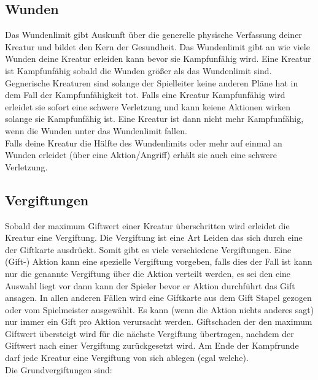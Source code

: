 \subsection*{Wunden}
Das Wundenlimit gibt Auskunft über die generelle physische Verfassung deiner Kreatur und bildet den Kern der Gesundheit. Das Wundenlimit gibt an wie viele Wunden deine Kreatur erleiden kann bevor sie Kampfunfähig wird.
Eine Kreatur ist Kampfunfähig sobald die Wunden größer als das Wundenlimit sind. Gegnerische Kreaturen sind solange der Spielleiter keine anderen Pläne hat in dem Fall der Kampfunfähigkeit tot. Falls eine Kreatur Kampfunfähig wird erleidet sie sofort eine schwere Verletzung und kann keiene Aktionen wirken solange sie Kampfunfähig ist. Eine Kreatur ist dann nicht mehr Kampfunfähig, wenn die Wunden unter das Wundenlimit fallen.\\
Falls deine Kreatur die Hälfte des Wundenlimits oder mehr auf einmal an Wunden erleidet (über eine Aktion/Angriff) erhält sie auch eine schwere Verletzung.

\subsection*{Vergiftungen}
Sobald der maximum Giftwert einer Kreatur überschritten wird erleidet die Kreatur eine Vergiftung. Die Vergiftung ist eine Art Leiden das sich durch eine der Giftkarte ausdrückt. Somit gibt es viele verschiedene Vergiftungen. Eine (Gift-) Aktion kann eine spezielle Vergiftung vorgeben, falls dies der Fall ist kann nur die genannte Vergiftung über die Aktion verteilt werden, es sei den eine Auswahl liegt vor dann kann der Spieler bevor er Aktion durchführt das Gift ansagen. In allen anderen Fällen wird eine Giftkarte aus dem Gift Stapel gezogen oder vom Spielmeister ausgewählt.
Es kann (wenn die Aktion nichts anderes sagt) nur immer ein Gift pro Aktion verursacht werden. Giftschaden der den maximum Giftwert übersteigt wird für die nächste Vergiftung übertragen, nachdem der Giftwert nach einer Vergiftung zurückgesetzt wird.
Am Ende der Kampfrunde darf jede Kreatur eine Vergiftung von sich ablegen (egal welche).\\
Die Grundvergiftungen sind:

